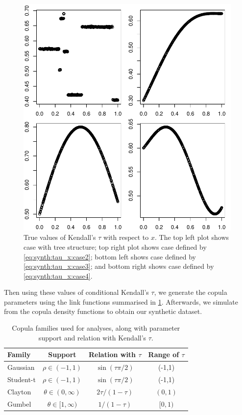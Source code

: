 \documentclass{amsart}
\begin{document}
\begin{figure}
    \centering
    \includegraphics[width=0.95\linewidth]{true_tau.pdf}
    \caption{True values of Kendall's $\tau$ with respect to $x$. The top left plot shows case with tree structure; top right plot shows case defined by \cref{eq:synth:tau_x:case2}; bottom left shows case defined by \cref{eq:synth:tau_x:case3}; and bottom right shows case defined by \cref{eq:synth:tau_x:case4}.}
    \label{fig:true:tau}
\end{figure}

Then using these values of conditional Kendall's $\tau$, we generate the copula parameters using the link functions summarised in \cref{tab:cop:link}. Afterwards, we simulate from the copula density functions to obtain our synthetic dataset.

\begin{table}
    \centering
    \begin{tabular}{l|c|c|c}
    \toprule
        Family & Support & Relation with $\tau$ & Range of $\tau$ \\
         \midrule
        Gaussian & $\rho \in (-1,1)$ & $\sin(\tau\pi/2)$ & (-1,1)\\
        Student-t & $\rho \in (-1,1)$ & $\sin(\tau\pi/2)$ & (-1,1) \\
        Clayton & $\theta \in (0,\infty)$ & $2\tau/(1-\tau)$ & $(0,1)$ \\
        Gumbel & $\theta\in [1,\infty)$ & $1/(1-\tau)$  & $[0,1)$ \\
        \bottomrule
    \end{tabular}
    \caption{Copula families used for analyses, along with parameter support and relation with Kendall's $\tau$.}
    \label{tab:cop:link}
\end{table}
\end{document}
